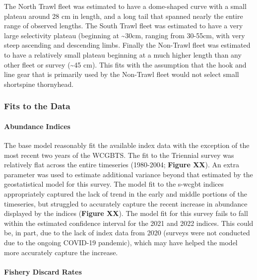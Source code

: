 \documentclass[11pt,
  english,
  letterpaper,
]{article}
\begin{document}
The North Trawl fleet was estimated to have a dome-shaped curve with a small plateau around 28 cm in length, and a long tail that spanned nearly the entire range of observed lengths. The South Trawl fleet was estimated to have a very large selectivity plateau (beginning at \textasciitilde30cm, ranging from 30-55cm, with very steep ascending and descending limbs. Finally the Non-Trawl fleet was estimated to have a relatively small plateau beginning at a much higher length than any other fleet or survey (\textasciitilde45 cm). This fits with the assumption that the hook and line gear that is primarily used by the Non-Trawl fleet would not select small shortspine thornyhead.

\hypertarget{fits-to-the-data}{%
\subsubsection{Fits to the Data}\label{fits-to-the-data}}

\hypertarget{abundance-indices}{%
\paragraph{Abundance Indices}\label{abundance-indices}}

The base model reasonably fit the available index data with the exception of the most recent two years of the WCGBTS. The fit to the Triennial survey was relatively flat across the entire timeseries (1980-2004; \textbf{Figure XX}). An extra parameter was used to estimate additional variance beyond that estimated by the geostatistical model for this survey. The model fit to the \gls{s-wcgbt} indices appropriately captured the lack of trend in the early and middle portions of the timeseries, but struggled to accurately capture the recent increase in abundance displayed by the indices (\textbf{Figure XX}). The model fit for this survey fails to fall within the estimated confidence interval for the 2021 and 2022 indices. This could be, in part, due to the lack of index data from 2020 (surveys were not conducted due to the ongoing COVID-19 pandemic), which may have helped the model more accurately capture the increase.

\hypertarget{fishery-discard-rates}{%
\paragraph{Fishery Discard Rates}\label{fishery-discard-rates}}
\end{document}
